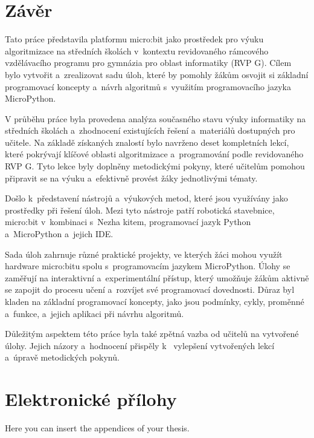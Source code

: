 \documentclass[
  digital,     %
  oneside,     %
  nosansbold,  %
  colorbold, %
  lof,         %
  nolot,         %
]{fithesis4}
\begin{document}
\chapter{Závěr}
Tato práce představila platformu micro:bit jako prostředek pro výuku algoritmizace na středních školách v~kontextu revidovaného rámcového vzdělávacího programu pro gymnázia pro oblast informatiky (RVP G). Cílem bylo vytvořit a~zrealizovat sadu úloh, které by pomohly žákům osvojit si základní programovací koncepty a~návrh algoritmů s~využitím programovacího jazyka MicroPython.

V průběhu práce byla provedena analýza současného stavu výuky informatiky na středních školách a~zhodnocení existujících řešení a~materiálů dostupných pro učitele. Na základě získaných znalostí bylo navrženo deset kompletních lekcí, které pokrývají klíčové oblasti algoritmizace a~programování podle revidovaného RVP G. Tyto lekce byly doplněny metodickými pokyny, které učitelům pomohou připravit se na výuku a~efektivně provést žáky jednotlivými tématy.

Došlo k~představení nástrojů a~výukových metod, které jsou využívány jako prostředky při řešení úloh. Mezi tyto nástroje patří robotická stavebnice, micro:bit v~kombinaci s~Nezha kitem, programovací jazyk Python a~MicroPython a~jejich IDE.

Sada úloh zahrnuje různé praktické projekty, ve kterých žáci mohou využít hardware micro:bitu spolu s~programovacím jazykem MicroPython. Úlohy se zaměřují na interaktivní a~experimentální přístup, který umožňuje žákům aktivně se zapojit do procesu učení a~rozvíjet své programovací dovednosti. Důraz byl kladen na základní programovací koncepty, jako jsou podmínky, cykly, proměnné a~funkce, a~jejich aplikaci při návrhu algoritmů.

Důležitým aspektem této práce byla také zpětná vazba od učitelů na vytvořené úlohy. Jejich názory a~hodnocení přispěly k~ vylepšení vytvořených lekcí a~úpravě metodických pokynů. 

\printbibliography[heading=bibintoc] %

  \makeatletter\thesis@blocks@clear\makeatother
  \printindex

\appendix %
\chapter{Elektronické přílohy}
Here you can insert the appendices of your thesis.
\end{document}

